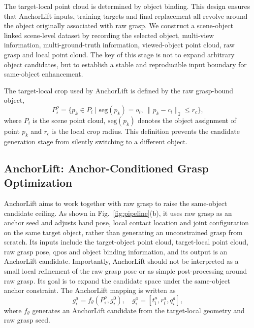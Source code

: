 \documentclass[lettersize,journal]{IEEEtran}
\begin{document}
The target-local point cloud is determined by object binding. This design ensures that AnchorLift inputs, training targets and final replacement all revolve around the object originally associated with raw grasp. We construct a scene-object linked scene-level dataset by recording the selected object, multi-view information, multi-ground-truth information, viewed-object point cloud, raw grasp and local point cloud. The key of this stage is not to expand arbitrary object candidates, but to establish a stable and reproducible input boundary for same-object enhancement.

The target-local crop used by AnchorLift is defined by the  raw grasp-bound object,
\begin{equation}
P_i^{o} =
\{p_k \in P_i \mid \mathrm{seg}(p_k)=o_i,\ 
\|p_k-c_i\|_2 \le r_c \},
\label{eq:target_crop}
\end{equation}
where $P_i$ is the scene point cloud, $\mathrm{seg}(p_k)$ denotes the object assignment of point $p_k$ and $r_c$ is the local crop radius. This definition prevents the candidate generation stage from silently switching to a different object.

\subsection{AnchorLift: Anchor-Conditioned Grasp Optimization }

AnchorLift aims to work together with raw grasp to raise the same-object candidate ceiling. As shown in Fig.~\ref{fig:pipeline}(b), it uses raw grasp as an anchor seed and adjusts hand pose, local contact location and joint configuration on the same target object, rather than generating an unconstrained grasp from scratch. Its inputs include the target-object point cloud, target-local point cloud, raw grasp pose, qpos and object binding information, and its output is an AnchorLift candidate. Importantly, AnchorLift should not be interpreted as a small local refinement of the raw grasp pose or as simple post-processing around raw grasp. Its goal is to expand the candidate space under the same-object anchor constraint. The AnchorLift mapping is written as
\begin{equation}
g_i^{a} = f_{\theta}(P_i^{o}, g_i^{0}),
\quad
g_i^{a}=[t_i^{a}, r_i^{a}, q_i^{a}],
\label{eq:anchorlift_generation}
\end{equation}
where $f_{\theta}$ generates an AnchorLift candidate from the target-local geometry and raw grasp seed.
\end{document}
